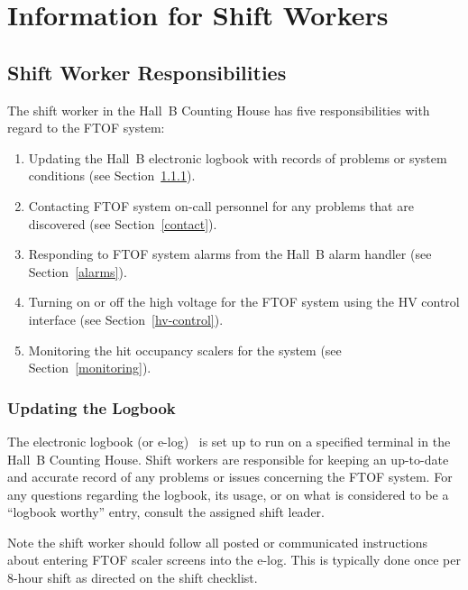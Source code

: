 \documentclass[12pt]{article}
\begin{document}
\clearpage

\vfil
\eject

\section{Information for Shift Workers}

\subsection{Shift Worker Responsibilities}

The shift worker in the Hall~B Counting House has five responsibilities with regard to the FTOF
system:

\begin{enumerate}
\item Updating the Hall~B electronic logbook with records of problems or system conditions (see 
Section~\ref{logbook}).

\item Contacting FTOF system on-call personnel for any problems that are discovered (see 
Section~\ref{contact}).

\item Responding to FTOF system alarms from the Hall~B alarm handler (see Section~\ref{alarms}).

\item Turning on or off the high voltage for the FTOF system using the HV control interface (see 
Section~\ref{hv-control}).

\item Monitoring the hit occupancy scalers for the system (see Section~\ref{monitoring}).
\end{enumerate}

\subsubsection{Updating the Logbook}
\label{logbook}

The electronic logbook (or e-log)~\cite{e-log} is set up to run on a specified terminal in the 
Hall~B Counting House. Shift workers are responsible for keeping an up-to-date and accurate record
of any problems or issues concerning the FTOF system. For any questions regarding the logbook, its
usage, or on what is considered to be a ``logbook worthy'' entry, consult the assigned shift leader.

Note the shift worker should follow all posted or communicated instructions about entering FTOF
scaler screens into the e-log. This is typically done once per 8-hour shift as directed on the
shift checklist.
\end{document}
